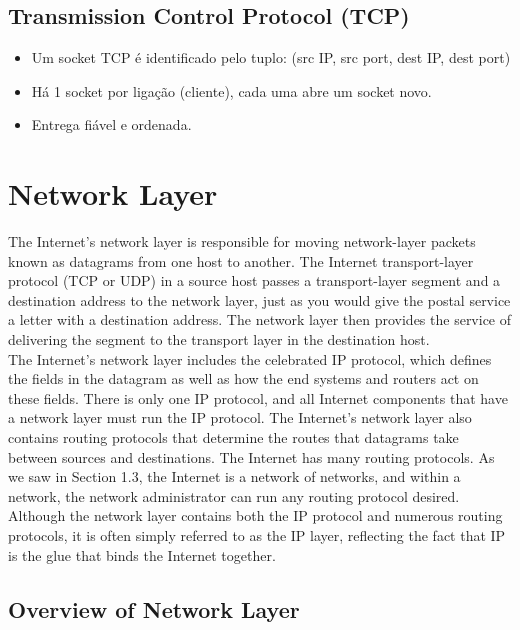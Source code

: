 \documentclass[12pt]{article}
\begin{document}
\subsection{Transmission Control Protocol (TCP)}

\begin{itemize}
    \item Um socket TCP é identificado pelo tuplo: (src IP, src port, dest IP, dest port)
    \item Há 1 socket por ligação (cliente), cada uma abre um socket novo.
    \item Entrega fiável e ordenada.
\end{itemize}

\newpage

\section{Network Layer}

The Internet's network layer is responsible for moving network-layer packets known as datagrams from one host to another. The Internet transport-layer protocol (TCP or UDP) in a source host passes a transport-layer segment and a destination address to the network layer, just as you would give the postal service a letter with a destination address. The network layer then provides the service of delivering the segment to the transport layer in the destination host. 
\vspace{0.5cm} \\
The Internet's network layer includes the celebrated IP protocol, which defines the fields in the datagram as well as how the end systems and routers act on these fields. There is only one IP protocol, and all Internet components that have a network layer must run the IP protocol. The Internet's network layer also contains routing protocols that determine the routes that datagrams take between sources and destinations. The Internet has many routing protocols. As we saw in Section 1.3, the Internet is a network of networks, and within a network, the network administrator can run any routing protocol desired. Although the network layer contains both the IP protocol and numerous routing protocols, it is often simply referred to as the IP layer, reflecting the fact that IP is the glue that binds the Internet together.

\subsection{Overview of Network Layer}
\end{document}
